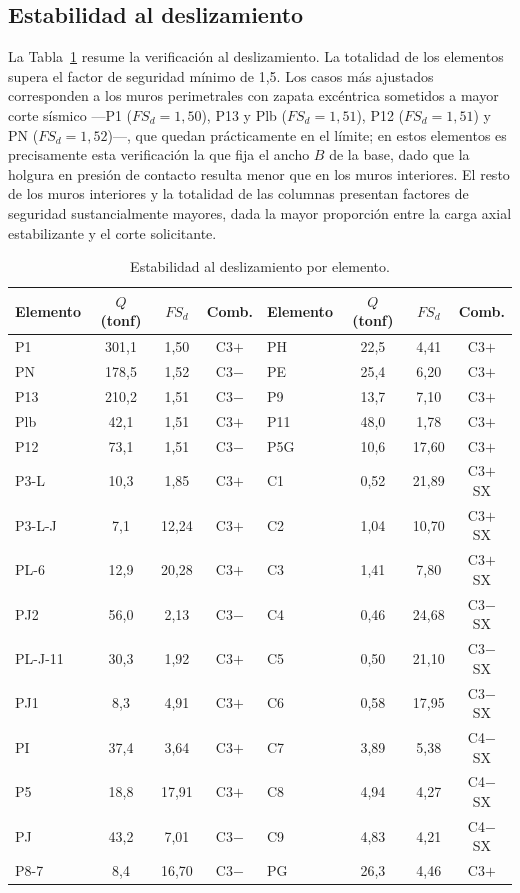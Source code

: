 \subsection{Estabilidad al deslizamiento}
La Tabla~\ref{tab:desliz} resume la verificación al deslizamiento. La totalidad de los elementos supera el factor de seguridad mínimo de 1,5. Los casos más ajustados corresponden a los muros perimetrales con zapata excéntrica sometidos a mayor corte sísmico —P1 ($FS_d = 1,50$), P13 y Plb ($FS_d = 1,51$), P12 ($FS_d = 1,51$) y PN ($FS_d = 1,52$)—, que quedan prácticamente en el límite; en estos elementos es precisamente esta verificación la que fija el ancho $B$ de la base, dado que la holgura en presión de contacto resulta menor que en los muros interiores. El resto de los muros interiores y la totalidad de las columnas presentan factores de seguridad sustancialmente mayores, dada la mayor proporción entre la carga axial estabilizante y el corte solicitante.

\begin{table}[H]
\centering
\footnotesize
\caption{Estabilidad al deslizamiento por elemento.}
\label{tab:desliz}
\begin{tabular}{lccc|lccc}
\hline
Elemento & $Q$ (tonf) & $FS_d$ & Comb. & Elemento & $Q$ (tonf) & $FS_d$ & Comb. \\
\hline
P1      & 301,1 & 1,50  & C3$+$ & PH  & 22,5 & 4,41  & C3$+$ \\
PN      & 178,5 & 1,52  & C3$-$ & PE  & 25,4 & 6,20  & C3$+$ \\
P13     & 210,2 & 1,51  & C3$-$ & P9  & 13,7 & 7,10  & C3$+$ \\
Plb     & 42,1  & 1,51  & C3$+$ & P11 & 48,0 & 1,78  & C3$+$ \\
P12     & 73,1  & 1,51  & C3$-$ & P5G & 10,6 & 17,60 & C3$+$ \\
P3-L    & 10,3  & 1,85  & C3$+$ & C1  & 0,52 & 21,89 & C3$+$SX \\
P3-L-J  & 7,1   & 12,24 & C3$+$ & C2  & 1,04 & 10,70 & C3$+$SX \\
PL-6    & 12,9  & 20,28 & C3$+$ & C3  & 1,41 & 7,80  & C3$+$SX \\
PJ2     & 56,0  & 2,13  & C3$-$ & C4  & 0,46 & 24,68 & C3$-$SX \\
PL-J-11 & 30,3  & 1,92  & C3$+$ & C5  & 0,50 & 21,10 & C3$-$SX \\
PJ1     & 8,3   & 4,91  & C3$+$ & C6  & 0,58 & 17,95 & C3$-$SX \\
PI      & 37,4  & 3,64  & C3$+$ & C7  & 3,89 & 5,38  & C4$-$SX \\
P5      & 18,8  & 17,91 & C3$+$ & C8  & 4,94 & 4,27  & C4$-$SX \\
PJ      & 43,2  & 7,01  & C3$-$ & C9  & 4,83 & 4,21  & C4$-$SX \\
P8-7    & 8,4   & 16,70 & C3$-$ & PG  & 26,3 & 4,46  & C3$+$ \\
\hline
\end{tabular}
\end{table}

